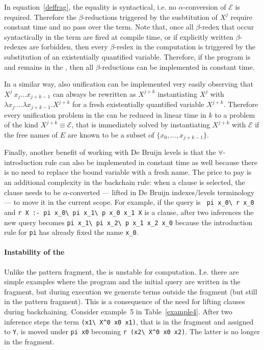 \documentclass{llncs}
\begin{document}
In equation~\ref{deffrag}, the equality is syntactical, i.e. no $\alpha$-conversion of $\mathcal{E}$ is required. Therefore the $\beta$-reductions triggered
by the susbtitution of $X^j$ require constant time and no pass over the term.
Note that, once all $\beta$-redex that occur syntactically in the term are
fired at compile time, or if explicitly written $\beta$-redexes are forbidden,
then every $\beta$-redex in the computation is triggered by the substitution
of an existentially quantified variable. Therefore, if the program is and
remains in the \frag, then all $\beta$-reductions can be implemented in
constant time.

In a similar way, also unification can be implemented very easily observing
that $X^j~x_j\ldots x_{j+k-1}$ can always be rewritten as
$X^{j+k}$ instantiating $X^j$ with $\lambda x_j. \ldots \lambda x_{j+k-1}. X^{j+k}$ for a fresh existentially quantified variable $X^{j+k}$. Therefore every
unification problem in the \frag{} can be reduced in linear time in $k$ to a
problem of the kind $X^{j+k} \equiv \mathcal{E}$, that is immediately solved
by instantiating $X^{j+k}$ with $\mathcal{E}$ if the free names of $E$ are
known to be a subset of $\{x_0,\ldots,x_{j+k-1}\}$.

Finally, another benefit of working with De Bruijn levels is that the
$\forall$-introduction rule can also be implemented in constant time as well
because there is no need to replace the bound variable with a fresh name.
The price to pay is an additional complexity in the backchain rule: when
a clause is selected, the clause needs to be $\alpha$-converted --- lifted
in De Bruijn indexes/levels terminology --- to move it in the current scope.
For example, if the query is \verb+ pi x_0\ r x_0+ and \verb+r X :- pi x_0\ pi x_1\ p x_0 x_1 X+ is a clause, after two inferences the new query becomes
\verb+pi x_1\ pi x_2\ p x_1 x_2 x_0+ because the introduction rule for
\verb+pi+ has already fixed the name \verb+x_0+.

\paragraph{Instability of the \frag}
Unlike the pattern fragment, the \frag{} is unstable for computation.
I.e. there are simple examples where the program and the initial query are
written in the fragment, but during execution we generate terms outside the
fragment (but still in the pattern fragment). This is a consequence of the
need for lifting clauses during backchaining.
Consider example~5 in Table~\ref{example4}.
After two inference steps the term \verb+(x1\ X^0 x0 x1)+, that is in
the fragment and assigned to \verb+Y+, is moved under \verb+pi x0+ becoming
\verb+r (x2\ X^0 x0 x2)+. The latter is no longer in the fragment.
\end{document}
